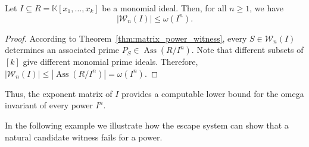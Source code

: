 \documentclass[11pt]{amsart}   %
\begin{document}
\begin{cor} \label{cor:omega_power_lower_bound}
Let $I\subseteq R=\mathbb K[x_1,\ldots,x_k]$ be a monomial ideal. Then, for all $n\geq1$, we have
$$|\mathcal W_n(I)| \leq\omega(I^n).$$
\end{cor}

\begin{proof}

According to  Theorem~\ref{thm:matrix_power_witness}, every $S\in\mathcal W_n(I)$ determines  an associated prime
 $P_S\in\operatorname{Ass}(R/I^n).$ Note that different subsets of $[k]$ give different monomial prime ideals.
Therefore, $|\mathcal W_n(I)|
\leq
|\operatorname{Ass}(R/I^n)|
=
\omega(I^n).
$
\end{proof}

Thus, the exponent matrix of $I$ provides a computable lower bound for
the omega invariant of every power $I^n$.




In the following example we  illustrate how the escape system can show that a natural
candidate witness fails for a power.
\end{document}
